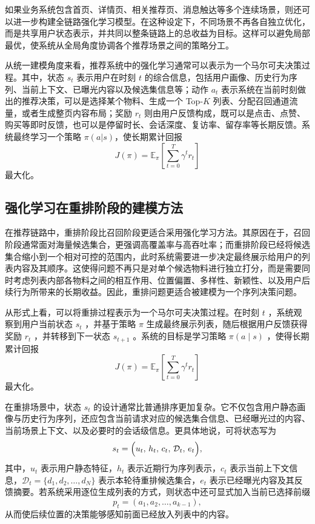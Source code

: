 \documentclass[UTF8]{ctexart}
\begin{document}
如果业务系统包含首页、详情页、相关推荐页、消息触达等多个连续场景，则还可以进一步构建全链路强化学习模型。在这种设定下，不同场景不再各自独立优化，而是共享用户状态表示，并共同以整条链路上的总收益为目标。这样可以避免局部最优，使系统从全局角度协调各个推荐场景之间的策略分工。

从统一建模角度来看，推荐系统中的强化学习通常可以表示为一个马尔可夫决策过程。其中，状态 \(s_t\) 表示用户在时刻 \(t\) 的综合信息，包括用户画像、历史行为序列、当前上下文、已曝光内容以及候选集信息等；动作 \(a_t\) 表示系统在当前时刻做出的推荐决策，可以是选择某个物料、生成一个 Top-\(K\) 列表、分配召回通道流量，或者生成整页内容布局；奖励 \(r_t\) 则由用户反馈构成，既可以是点击、点赞、购买等即时反馈，也可以是停留时长、会话深度、复访率、留存率等长期反馈。系统最终学习一个策略 \(\pi(a|s)\)，使长期累计回报
\[ J(\pi)=\mathbb{E}_{\pi}\!\left[\sum_{t=0}^{T}\gamma^t r_t\right] \]
最大化。

\subsection{强化学习在重排阶段的建模方法}
在推荐链路中，重排阶段比召回阶段更适合采用强化学习方法。其原因在于，召回阶段通常面对海量候选集合，更强调高覆盖率与高吞吐率；而重排阶段已经将候选集合缩小到一个相对可控的范围内，此时系统需要进一步决定最终展示给用户的列表内容及其顺序。这使得问题不再只是对单个候选物料进行独立打分，而是需要同时考虑列表内部各物料之间的相互作用、位置偏置、多样性、新颖性、以及用户后续行为所带来的长期收益。因此，重排问题更适合被建模为一个序列决策问题。

从形式上看，可以将重排过程表示为一个马尔可夫决策过程。在时刻 \(t\) ，系统观察到用户当前状态 \(s_t\) ，并基于策略 \(\pi\) 生成最终展示列表，随后根据用户反馈获得奖励 \(r_t\) ，并转移到下一状态 \(s_{t+1}\) 。系统的目标是学习策略 \(\pi(a\mid s)\) ，使得长期累计回报
\[ J(\pi)=\mathbb{E}_{\pi}\!\left[\sum_{t=0}^{T}\gamma^t r_t\right] \]
最大化。

在重排场景中，状态 \(s_t\) 的设计通常比普通排序更加复杂。它不仅包含用户静态画像与历史行为序列，还应包含当前请求对应的候选集合信息、已经曝光过的内容、当前场景上下文、以及必要时的会话级信息。更具体地说，可将状态写为
\[ s_t=\Bigl(u_t,\,h_t,\,c_t,\,\mathcal{D}_t,\,e_t \Bigr), \]
其中，\(u_t\) 表示用户静态特征，\(h_t\) 表示近期行为序列表示，\(c_t\) 表示当前上下文信息，\(\mathcal{D}_t=\{d_1,d_2,\dots,d_N\}\) 表示本轮待重排候选集合，\(e_t\) 表示已经曝光内容及其反馈摘要。若系统采用逐位生成列表的方式，则状态中还可显式加入当前已选择前缀
\[ p_t=(a_1,a_2,\dots,a_{k-1}), \]
从而使后续位置的决策能够感知前面已经放入列表中的内容。
\end{document}

